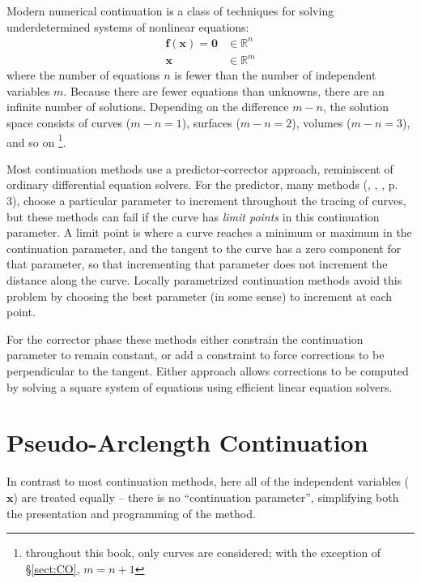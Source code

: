 \documentclass[10pt,openany,twoside]{book}
\numberwithin{equation}{section}   %
\newcommand{\Newterm}[1]{{\em #1}}
\newcommand{\Vector}[1]{\boldsymbol{#1}}
\newcommand{\Sectref}[1]{\S\ref{#1}}
\begin{document}
Modern numerical continuation is a class of techniques for solving
underdetermined systems of nonlinear equations:
\begin{align}\label{eqn:fx}
\Vector{f}(\Vector{x}) = \Vector{0} & \in \mathbb{R}^{n} \nonumber \\
\Vector{x} & \in \mathbb{R}^{m}
\end{align}
where the number of equations $n$
is fewer than the number of independent variables $m$.
Because there are fewer equations than unknowns, there are an infinite
number of solutions.
Depending on the difference $m-n$, the solution space consists of
curves ($m-n = 1$), surfaces ($m-n = 2$), volumes ($m-n = 3$), and so on
\footnote{throughout this book, only curves are considered; with the
exception of \Sectref{sect:CO}, $m = n+1$}.

Most continuation methods use a predictor-corrector approach,
reminiscent of ordinary differential equation solvers.
For the predictor, many methods
(\cite{cardani1978continuation}, \cite{yu2020nonlinear},
\cite{rheinboldt1983algorithm},
\cite{allgower1990numerical} p. 3),
choose a particular parameter to increment throughout the tracing of curves,
but these methods can fail if the curve has \Newterm{limit points} in
this continuation parameter.
A limit point is where a curve reaches a minimum or maximum in the continuation
parameter, and the tangent to the curve has a zero component for that parameter,
so that incrementing that parameter does not increment the distance along the
curve. Locally parametrized continuation methods \cite{rheinboldt1983locally}
avoid this problem
by choosing the best parameter (in some sense) to increment at each point.

For the corrector phase these methods either constrain the continuation parameter
to remain constant, or add a constraint to force corrections to be perpendicular to
the tangent. Either approach allows corrections to be computed by solving a
square system of equations using efficient linear equation solvers.

\section{Pseudo-Arclength Continuation}\label{sect:pseudo}
In contrast to most continuation methods, here all of the independent
variables ($\Vector{x}$) are treated equally -- there is no
``continuation parameter'', simplifying both the presentation and
programming of the method.
\end{document}
